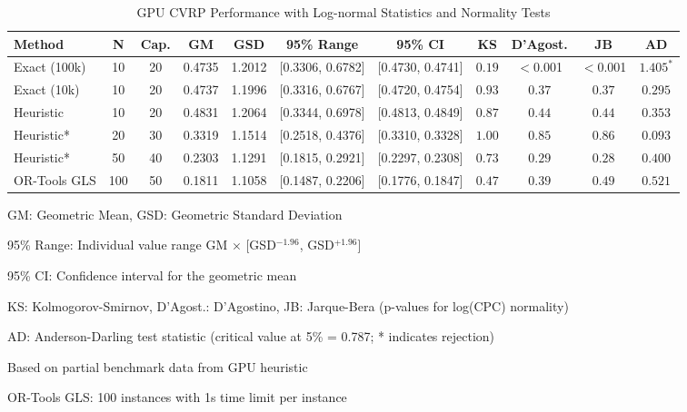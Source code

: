 \documentclass[a4paper,twoside]{article}
\begin{document}
\begin{table}[htbp]
\centering
\caption{GPU CVRP Performance with Log-normal Statistics and Normality Tests}
\label{tab:gpu-performance-complete}
\begin{tabular}{@{}l c c S[table-format=1.4] S[table-format=1.4] c c c c c c@{}}
\toprule
\textbf{Method} & \textbf{N} & \textbf{Cap.} & {\textbf{GM}} & {\textbf{GSD}} & 
\textbf{95\% Range} & \textbf{95\% CI} & \textbf{KS} & \textbf{D'Agost.} & \textbf{JB} & \textbf{AD} \\
\midrule
Exact (100k) & 10 & 20 & 0.4735 & 1.2012 & [0.3306, 0.6782] & [0.4730, 0.4741] & $0.19$ & $<$0.001 & $<$0.001 & $1.405^*$ \\
Exact (10k) & 10 & 20 & 0.4737 & 1.1996 & [0.3316, 0.6767] & [0.4720, 0.4754] & $0.93$ & $0.37$ & $0.37$ & $0.295$ \\
Heuristic & 10 & 20 & 0.4831 & 1.2064 & [0.3344, 0.6978] & [0.4813, 0.4849] & $0.87$ & $0.44$ & $0.44$ & $0.353$ \\
Heuristic* & 20 & 30 & 0.3319 & 1.1514 & [0.2518, 0.4376] & [0.3310, 0.3328] & $1.00$ & $0.85$ & $0.86$ & $0.093$ \\
Heuristic* & 50 & 40 & 0.2303 & 1.1291 & [0.1815, 0.2921] & [0.2297, 0.2308] & $0.73$ & $0.29$ & $0.28$ & $0.400$ \\
OR-Tools GLS & 100 & 50 & 0.1811 & 1.1058 & [0.1487, 0.2206] & [0.1776, 0.1847] & $0.47$ & $0.39$ & $0.49$ & $0.521$ \\
\bottomrule
\end{tabular}
\begin{tablenotes}
\small
\item GM: Geometric Mean, GSD: Geometric Standard Deviation
\item 95\% Range: Individual value range GM $\times$ [GSD$^{-1.96}$, GSD$^{+1.96}$]
\item 95\% CI: Confidence interval for the geometric mean
\item KS: Kolmogorov-Smirnov, D'Agost.: D'Agostino, JB: Jarque-Bera (p-values for log(CPC) normality)
\item AD: Anderson-Darling test statistic (critical value at 5\% = 0.787; * indicates rejection)
\item * Based on partial benchmark data from GPU heuristic
\item OR-Tools GLS: 100 instances with 1s time limit per instance
\end{tablenotes}
\end{table}
\end{document}
